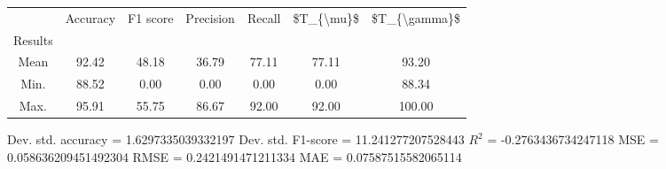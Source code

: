 \begin{tabular}{|c|c|c|c|c|c|c|}
\toprule
{} &  Accuracy &  F1 score &  Precision &  Recall &  \$T\_\{\textbackslash mu\}\$ &  \$T\_\{\textbackslash gamma\}\$ \\
Results &           &           &            &         &            &               \\
\hline
Mean    &     92.42 &     48.18 &      36.79 &   77.11 &      77.11 &         93.20 \\
Min.    &     88.52 &      0.00 &       0.00 &    0.00 &       0.00 &         88.34 \\
Max.    &     95.91 &     55.75 &      86.67 &   92.00 &      92.00 &        100.00 \\
\bottomrule
\end{tabular}

 Dev. std. accuracy = 1.6297335039332197
 Dev. std. F1-score = 11.241277207528443
 $R^2$ = -0.2763436734247118
 MSE = 0.058636209451492304
 RMSE = 0.2421491471211334
 MAE = 0.07587515582065114